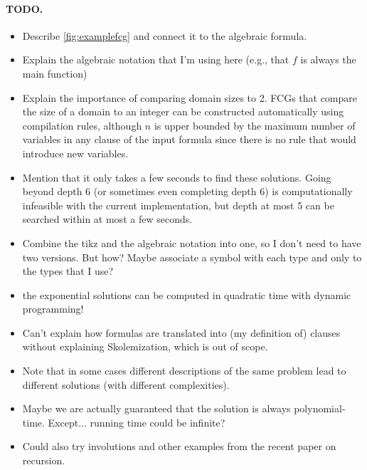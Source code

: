 \paragraph{TODO.}
\begin{itemize}
\item Describe \cref{fig:examplefcg} and connect it to the algebraic formula.
\item Explain the algebraic notation that I'm using here (e.g., that $f$ is always the main function)
\item Explain the importance of comparing domain sizes to 2. FCGs that compare the size of a domain to an integer can be constructed automatically using compilation rules, although $n$ is upper bounded by the maximum number of variables in any clause of the input formula since there is no rule that would introduce new variables.
\item Mention that it only takes a few seconds to find these solutions. Going beyond depth 6 (or sometimes even completing depth 6) is computationally infeasible with the current implementation, but depth at most 5 can be searched within at most a few seconds.
\item Combine the tikz and the algebraic notation into one, so I don't need to have two versions. But how? Maybe associate a symbol with each type and only to the types that I use?
\item the exponential solutions can be computed in quadratic time with dynamic programming!
\item Can't explain how formulas are translated into (my definition of) clauses without explaining Skolemization, which is out of scope.
\item Note that in some cases different descriptions of the same problem lead to different solutions (with different complexities).
\item Maybe we are actually guaranteed that the solution is always polynomial-time. Except... running time could be infinite?
\item Could also try involutions and other examples from the recent paper on recursion.
\end{itemize}

